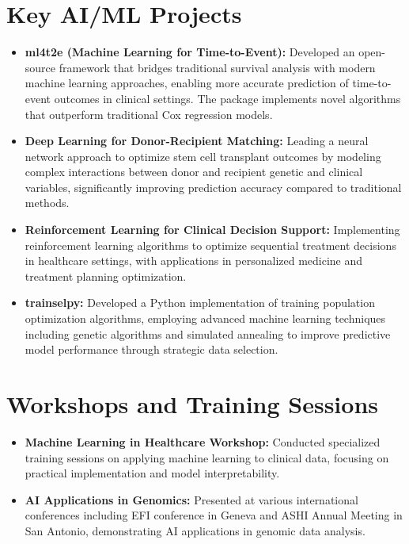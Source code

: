 \documentclass[11pt,a4paper,]{moderncv}
\providecommand{\tightlist}{%
	\setlength{\itemsep}{0pt}\setlength{\parskip}{0pt}}
\begin{document}
\section{Key AI/ML Projects}\label{key-aiml-projects}

\begin{itemize}
\item
  \textbf{ml4t2e (Machine Learning for Time-to-Event):} Developed an
  open-source framework that bridges traditional survival analysis with
  modern machine learning approaches, enabling more accurate prediction
  of time-to-event outcomes in clinical settings. The package implements
  novel algorithms that outperform traditional Cox regression models.
\item
  \textbf{Deep Learning for Donor-Recipient Matching:} Leading a neural
  network approach to optimize stem cell transplant outcomes by modeling
  complex interactions between donor and recipient genetic and clinical
  variables, significantly improving prediction accuracy compared to
  traditional methods.
\item
  \textbf{Reinforcement Learning for Clinical Decision Support:}
  Implementing reinforcement learning algorithms to optimize sequential
  treatment decisions in healthcare settings, with applications in
  personalized medicine and treatment planning optimization.
\item
  \textbf{trainselpy:} Developed a Python implementation of training
  population optimization algorithms, employing advanced machine
  learning techniques including genetic algorithms and simulated
  annealing to improve predictive model performance through strategic
  data selection.
\end{itemize}

\section{Workshops and Training
Sessions}\label{workshops-and-training-sessions}

\begin{itemize}
\tightlist
\item
  \textbf{Machine Learning in Healthcare Workshop:} Conducted
  specialized training sessions on applying machine learning to clinical
  data, focusing on practical implementation and model interpretability.
\item
  \textbf{AI Applications in Genomics:} Presented at various
  international conferences including EFI conference in Geneva and ASHI
  Annual Meeting in San Antonio, demonstrating AI applications in
  genomic data analysis.
\end{itemize}
\end{document}
